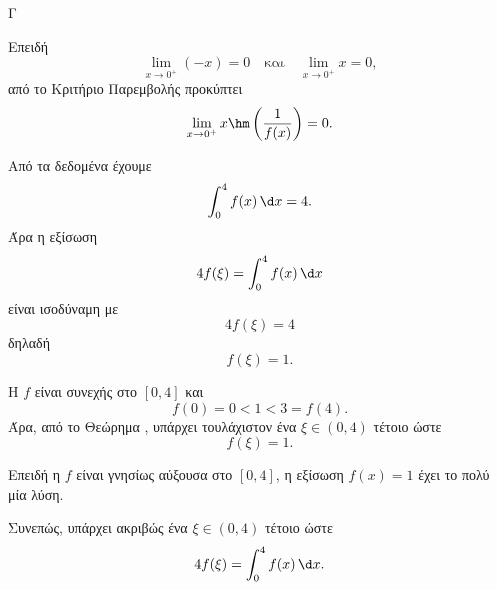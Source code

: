 \begin{thema}{Γ}
\begin{erwthma}
Επειδή
\[
\lim_{x\to 0^+}(-x)=0
\quad \text{και}\quad
\lim_{x\to 0^+}x=0,
\]
από το Κριτήριο Παρεμβολής προκύπτει
\[
\lim_{x\to 0^+}x\hm\left(\frac{1}{f(x)}\right)=0.
\]

\item Από τα δεδομένα έχουμε
\[
\int_0^4 f(x)\,\d x=4.
\]
Άρα η εξίσωση
\[
4f(\xi)=\int_0^4 f(x)\,\d x
\]
είναι ισοδύναμη με
\[
4f(\xi)=4
\]
δηλαδή
\[
f(\xi)=1.
\]

Η $f$ είναι συνεχής στο $[0,4]$ και
\[
f(0)=0<1<3=f(4).
\]
Άρα, από το Θεώρημα , υπάρχει τουλάχιστον ένα $\xi\in(0,4)$ τέτοιο ώστε
\[
f(\xi)=1.
\]

Επειδή η $f$ είναι γνησίως αύξουσα στο $[0,4]$, η εξίσωση $f(x)=1$ έχει το πολύ μία λύση.

Συνεπώς, υπάρχει ακριβώς ένα $\xi\in(0,4)$ τέτοιο ώστε
\[
4f(\xi)=\int_0^4 f(x)\,\d x.
\]
\end{erwthma}
\end{thema}



